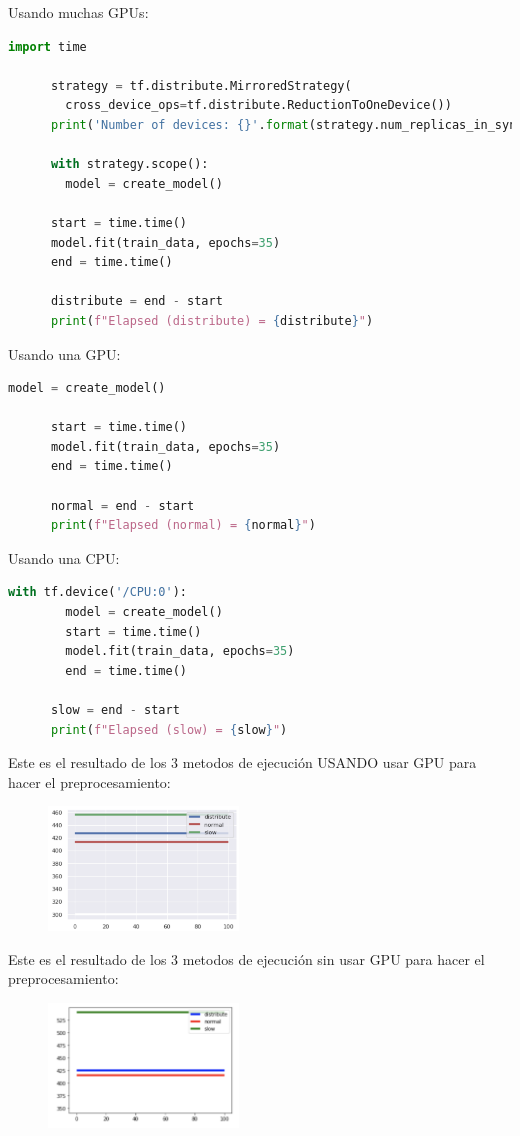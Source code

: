 \documentclass[10pt, fleqn, journal]{IEEEtran}
\theoremstyle{break}                                            %
\begin{document}
    \clearpage

    Usando muchas GPUs:
    \begin{lstlisting}[language=python, gobble=5]
      import time

      strategy = tf.distribute.MirroredStrategy(
        cross_device_ops=tf.distribute.ReductionToOneDevice())
      print('Number of devices: {}'.format(strategy.num_replicas_in_sync))

      with strategy.scope(): 
        model = create_model()

      start = time.time()
      model.fit(train_data, epochs=35)
      end = time.time()

      distribute = end - start
      print(f"Elapsed (distribute) = {distribute}")
    \end{lstlisting}

    Usando una GPU:
    \begin{lstlisting}[language=python, gobble=5]
      model = create_model()

      start = time.time()
      model.fit(train_data, epochs=35)
      end = time.time()

      normal = end - start
      print(f"Elapsed (normal) = {normal}")
    \end{lstlisting}

    Usando una CPU:
    \begin{lstlisting}[language=python, gobble=5]
      with tf.device('/CPU:0'):
        model = create_model()
        start = time.time()
        model.fit(train_data, epochs=35)
        end = time.time()

      slow = end - start
      print(f"Elapsed (slow) = {slow}")
    \end{lstlisting}

    Este es el resultado de los 3 metodos de ejecución USANDO usar GPU para hacer el preprocesamiento:
    \begin{figure}[ht!]
      \includegraphics[width=0.45\textwidth]{experiments}
    \end{figure}

    Este es el resultado de los 3 metodos de ejecución sin usar GPU para hacer el preprocesamiento:
    \begin{figure}[ht!]
      \includegraphics[width=0.45\textwidth]{experiments2}
    \end{figure}
\end{document}
